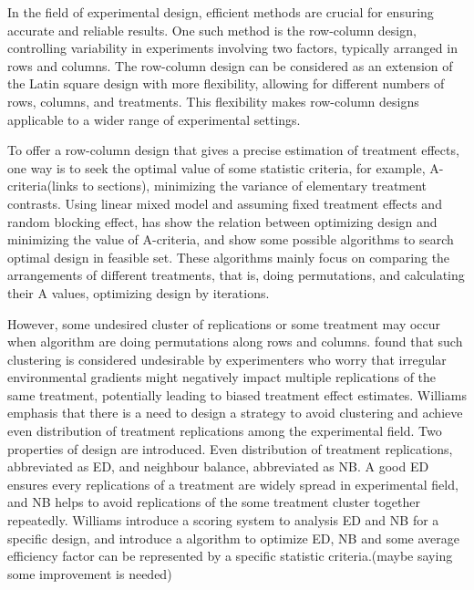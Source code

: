 \documentclass[
  a4paper,
  oneside,
  openany,
  12pt,
  onecolumn]{book}
\theoremstyle{plain}
\theoremstyle{definition}
\theoremstyle{remark}
\begin{document}
In the field of experimental design, efficient methods are crucial for
ensuring accurate and reliable results. One such method is the
row-column design, controlling variability in experiments involving two
factors, typically arranged in rows and columns. The row-column design
can be considered as an extension of the Latin square design with more
flexibility, allowing for different numbers of rows, columns, and
treatments. This flexibility makes row-column designs applicable to a
wider range of experimental settings.

To offer a row-column design that gives a precise estimation of
treatment effects, one way is to seek the optimal value of some
statistic criteria, for example, A-criteria(links to sections),
minimizing the variance of elementary treatment contrasts. Using linear
mixed model and assuming fixed treatment effects and random blocking
effect, \citet{butler2013optimal} has show the relation between
optimizing design and minimizing the value of A-criteria, and show some
possible algorithms to search optimal design in feasible set. These
algorithms mainly focus on comparing the arrangements of different
treatments, that is, doing permutations, and calculating their A values,
optimizing design by iterations.

However, some undesired cluster of replications or some treatment may
occur when algorithm are doing permutations along rows and columns.
\citet{piepho2018neighbor} found that such clustering is considered
undesirable by experimenters who worry that irregular environmental
gradients might negatively impact multiple replications of the same
treatment, potentially leading to biased treatment effect estimates.
Williams emphasis that there is a need to design a strategy to avoid
clustering and achieve even distribution of treatment replications among
the experimental field. Two properties of design are introduced. Even
distribution of treatment replications, abbreviated as ED, and neighbour
balance, abbreviated as NB. A good ED ensures every replications of a
treatment are widely spread in experimental field, and NB helps to avoid
replications of the some treatment cluster together repeatedly. Williams
introduce a scoring system to analysis ED and NB for a specific design,
and introduce a algorithm to optimize ED, NB and some average efficiency
factor can be represented by a specific statistic criteria.(maybe saying
some improvement is needed)
\end{document}
